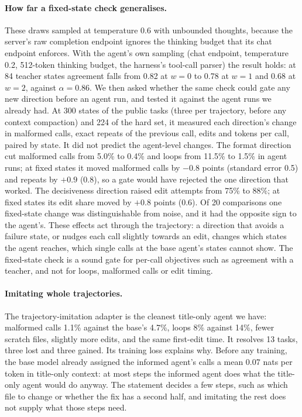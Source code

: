 \documentclass[11pt]{article}
\begin{document}
\paragraph{How far a fixed-state check generalises.} These draws sampled at temperature 0.6 with unbounded thoughts, because the server's raw completion endpoint ignores the thinking budget that its chat endpoint enforces. With the agent's own sampling (chat endpoint, temperature 0.2, 512-token thinking budget, the harness's tool-call parser) the result holds: at 84 teacher states agreement falls from 0.82 at $w = 0$ to 0.78 at $w = 1$ and 0.68 at $w = 2$, against $\alpha = 0.86$. We then asked whether the same check could gate any new direction before an agent run, and tested it against the agent runs we already had. At 300 states of the public tasks (three per trajectory, before any context compaction) and 224 of the hard set, it measured each direction's change in malformed calls, exact repeats of the previous call, edits and tokens per call, paired by state. It did not predict the agent-level changes. The format direction cut malformed calls from 5.0\% to 0.4\% and loops from 11.5\% to 1.5\% in agent runs; at fixed states it moved malformed calls by $-0.8$ points (standard error 0.5) and repeats by $+0.9$ (0.8), so a gate would have rejected the one direction that worked. The decisiveness direction raised edit attempts from 75\% to 88\%; at fixed states its edit share moved by $+0.8$ points (0.6). Of 20 comparisons one fixed-state change was distinguishable from noise, and it had the opposite sign to the agent's. These effects act through the trajectory: a direction that avoids a failure state, or nudges each call slightly towards an edit, changes which states the agent reaches, which single calls at the base agent's states cannot show. The fixed-state check is a sound gate for per-call objectives such as agreement with a teacher, and not for loops, malformed calls or edit timing.

\paragraph{Imitating whole trajectories.} The trajectory-imitation adapter is the cleanest title-only agent we have: malformed calls 1.1\% against the base's 4.7\%, loops 8\% against 14\%, fewer scratch files, slightly more edits, and the same first-edit time. It resolves 13 tasks, three lost and three gained. Its training loss explains why. Before any training, the base model already assigned the informed agent's calls a mean 0.07 nats per token in title-only context: at most steps the informed agent does what the title-only agent would do anyway. The statement decides a few steps, such as which file to change or whether the fix has a second half, and imitating the rest does not supply what those steps need.
\end{document}
